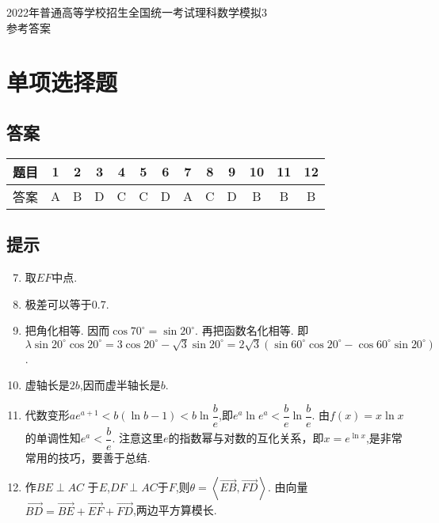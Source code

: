 \documentclass[11pt]{article}
\begin{document}
	\begin{center}
		\songti \Large 2022年普通高等学校招生全国统一考试理科数学模拟3
		\\ \heiti 参考答案
	\end{center}
\section{\heiti 单项选择题}
\subsection{\heiti 答案}
\begin{center}
	\begin{tabular}{ccccccccccccc}
		\hline 
		题目 & 1 & 2 & 3 & 4 & 5 & 6 & 7 & 8 & 9 & 10 & 11 & 12 \\
		\hline
		答案 & A & B & D & C & C & D & A & C & D & B & B & B \\
		\hline
	\end{tabular}
\end{center}
\subsection{\heiti 提示}
\begin{enumerate}
	\setcounter{enumi}{6}
	\item 取$ EF $中点.
	\item 极差可以等于0.7.
	\item 把角化相等. 因而$ \cos 70^\circ=\sin 20^\circ $. 再把函数名化相等. 即$ \lambda \sin 20^\circ \cos 20^\circ=3\cos 20^\circ -\sqrt{3} \sin 20^\circ =2\sqrt{3}(\sin 60^\circ \cos 20^\circ-\cos 60^\circ \sin 20^\circ) $. 
	\item 虚轴长是$ 2b $,因而虚半轴长是$ b $.
	\item 代数变形$ ae^{a+1}<b(\ln b-1)<b \ln \dfrac{b}{e} $,即$ e^a \ln e^a<\dfrac{b}{e} \ln \dfrac{b}{e} $. 由$ f(x)=x \ln x $的单调性知$ e^a<\dfrac{b}{e} $. 注意这里$ e $的指数幂与对数的互化关系，即$ x=e^{\ln x} $,是\heiti 非常常用的技巧\songti ，要善于总结.
	\item 作$ BE\perp AC$ 于$ E $,$DF\perp AC $于$ F $,则$ \theta =\left \langle \overrightarrow{EB} ,\overrightarrow{FD}  \right \rangle  $. 由向量$ \overrightarrow{BD} =\overrightarrow{BE} +\overrightarrow{EF} +\overrightarrow{FD}  $,两边平方算模长.
\end{enumerate}
\end{document}
